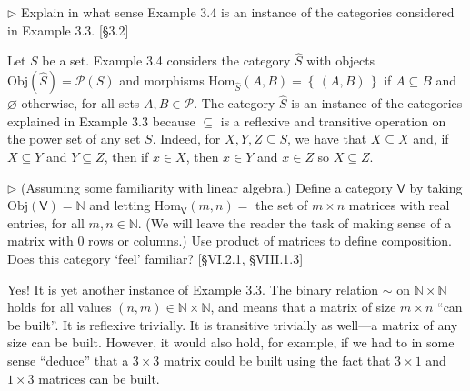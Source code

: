 \documentclass[12pt,letterpaper,boxed]{hmcpset}
\newcommand{\Obj}{\mathrm{Obj}}
\newcommand{\Hom}{\mathrm{Hom}}
\newcommand{\set}[1]{\left\{\,#1\,\right\}}
\begin{document}
\begin{problem}[3.5]
	$\rhd$ Explain in what sense Example 3.4 is an instance of the categories
	considered in Example 3.3. [\S 3.2]
\end{problem}
\begin{solution}
	Let $S$ be a set. Example 3.4 considers the category $\hat{S}$ with objects
	$\Obj(\hat{S}) = \mathscr{P}(S)$ and morphisms $\Hom_{\hat{S}}(A,B) =
	\set{(A,B)}$ if $A\subseteq B$ and $\varnothing$ otherwise, for all sets
	$A,B\in\mathscr{P}$. The category $\hat{S}$ is an instance of the categories
	explained in Example 3.3 because $\subseteq$ is a reflexive and transitive
	operation on the power set of any set $S$. Indeed, for $X,Y,Z\subseteq S$, we have
	that $X\subseteq X$ and, if $X\subseteq Y$ and $Y\subseteq Z$, then if $x\in X$,
	then $x\in Y$ and $x\in Z$ so $X\subseteq Z$.
\end{solution}


\begin{problem}[3.6]
	$\rhd$ (Assuming some familiarity with linear algebra.) Define a category
	$\mathsf{V}$ by taking $\Obj(\mathsf{V}) = \mathbb{N}$ and letting
	$\Hom_{\mathsf{V}}(m,n) = $ the set of $m\times n$ matrices with real
	entries, for all $m,n\in\mathbb{N}$. (We will leave the reader the task of
	making sense of a matrix with 0 rows or columns.) Use product of matrices to
	define composition. Does this category `feel' familiar? [\S VI.2.1, \S VIII.1.3]
\end{problem}
\begin{solution}
	Yes! It is yet another instance of Example 3.3. The binary relation $\sim$ on
	$\mathbb{N} \times \mathbb{N}$ holds for all values $(n,m)\in\mathbb{N} \times
	\mathbb{N}$, and means that a matrix of size $m\times n$ ``can be built''. It is
	reflexive trivially. It is transitive trivially as well---a matrix of any size
	can be built. However, it would also hold, for example, if we had to in some
	sense ``deduce'' that a $3\times 3$ matrix could be built using the fact that
	$3\times 1$ and $1\times 3$ matrices can be built.
\end{solution}
\end{document}
